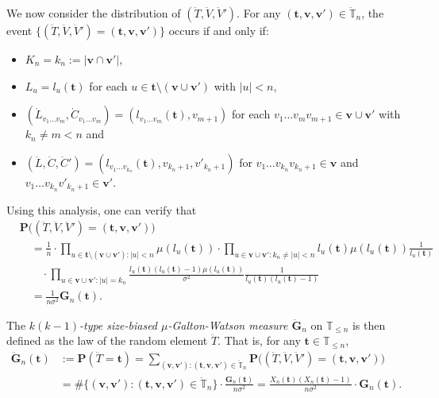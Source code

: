 \documentclass[12pt,a4paper]{amsart}
\numberwithin{equation}{section}
\begin{document}
	We now consider the distribution of $(\ddot T,\ddot V,\ddot V')$.
	For any $( \mathbf t , \mathbf v, \mathbf v')\in\ddot {\mathbb T}_n$, the event $\{(\ddot T,\ddot V,\ddot V')=( \mathbf t , \mathbf v, \mathbf v')\}$ occurs if and only if:
\begin{itemize}
\item
    $K_n=k_n:=| \mathbf v\cap \mathbf v'|$,
\item
    $L_u=l_u( \mathbf t )$ for each $u\in  \mathbf t \setminus( \mathbf v\cup \mathbf v')$ with $| u| <n$,
\item
	$(\dot L_{v_1\dots v_m},\dot C_{v_1\dots v_m})=(l_{v_1\dots v_m}( \mathbf t ),v_{m+1})$ for each $v_1\dots v_mv_{m+1}\in \mathbf v\cup \mathbf v'$ with $k_n\neq m<n$ and
\item
	$(\ddot L,\ddot C,\ddot C')=(l_{v_1\dots v_{k_n}}( \mathbf t ),v_{k_n+1},v'_{k_n+1})$ for $v_1\dots v_{k_n}v_{k_n+1}\in \mathbf v$ and $v_1\dots v_{k_n}v'_{k_n+1}\in \mathbf v'$.
\end{itemize}
	Using this analysis, one can verify that
\begin{align*}
		&\mathbf P\big((\ddot T,\ddot V,\ddot V')=( \mathbf t , \mathbf v, \mathbf v')\big)\\
	&\quad= \frac{1}{n} \cdot \prod_{u\in  \mathbf t \setminus( \mathbf v\cup  \mathbf v'):|u|<n} \mu(l_u( \mathbf t )) \cdot \prod_{u\in  \mathbf v\cup  \mathbf v':k_n\neq|u|<n}l_u( \mathbf t ) \mu(l_u( \mathbf t ))\frac{1}{l_u( \mathbf t )}
    \\&\qquad \cdot \prod_{u\in  \mathbf v \cup  \mathbf v':|u|=k_n}\frac{l_u( \mathbf t )(l_u( \mathbf t )-1) \mu(l_u( \mathbf t ))}{\sigma^2}\frac{1}{l_u( \mathbf t )(l_u( \mathbf t )-1)}\\
	&\quad = \frac{1}{n\sigma^2} \mathbf G_n( \mathbf t ).
\end{align*}
	
	The \emph{$k(k-1)$-type size-biased $\mu$-Galton-Watson measure $\ddot{\mathbf G}_n$} on $\mathbb T_{\leq n}$ is then defined as the law of the random element $\ddot T$. That is, for any $ \mathbf t \in\mathbb T_{\leq n}$,
\begin{equation}
\label{eq:k(k-1)typesizebiasedGWmeasure}
\begin{split}
		\ddot{\mathbf G}_n( \mathbf t )
	&:= \mathbf P(\ddot T= \mathbf t )
	= \sum_{( \mathbf v, \mathbf v'):( \mathbf t , \mathbf v, \mathbf v')\in \ddot {\mathbb T}_n} \mathbf P\big((\ddot T,\ddot V,\ddot V')=( \mathbf t , \mathbf v, \mathbf v')\big)
	\\&= \#\{( \mathbf v, \mathbf v'):( \mathbf t , \mathbf v, \mathbf v')\in \ddot {\mathbb T}_n\} \cdot \frac{\mathbf G_n( \mathbf t )}{n\sigma^2}
	= \frac{X_n( \mathbf t )(X_n( \mathbf t )-1)}{n\sigma^2} \cdot{\mathbf G}_n( \mathbf t ).
\end{split}
\end{equation}
\end{document}
